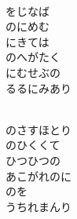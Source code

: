 \documentclass[10pt,b5j]{tarticle} %
\begin{document}
\begin{enumerate}
\begin{minipage}[c]{\blocksize}
    \end{minipage}
    \begin{minipage}[c]{\blocksize}
        
        \vspace{\linespace}
        \item~\\
        をじなば\\
        のにめむ\\
        にきては\\
        のへがたく\\
        にむせぶの\\
        るるにみあり
        
    \end{minipage}
    \begin{minipage}[c]{\blocksize}
        
        \vspace{\linespace}
        \item~\\
        のさすほとり\\
        のひくくて\\
        ひつひつの\\
        あこがれのに\\
        のを\\
        うちれまんり
    
    \end{minipage}
\end{enumerate} %
\end{document}
